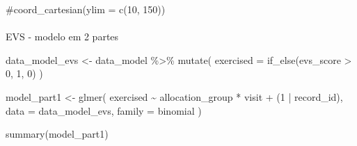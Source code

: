 \documentclass[
  12pt,
]{article}
\makeatletter
\let\oldparagraph\paragraph
\renewcommand{\paragraph}{
    \@ifstar
      \xxxParagraphStar
      \xxxParagraphNoStar
  }
\newcommand{\xxxParagraphStar}[1]{\oldparagraph*{#1}\mbox{}}
\newcommand{\xxxParagraphNoStar}[1]{\oldparagraph{#1}\mbox{}}
\newenvironment{Shaded}{\begin{snugshade}}{\end{snugshade}}
\newcommand{\AttributeTok}[1]{\textcolor[rgb]{0.40,0.45,0.13}{#1}}
\newcommand{\CommentTok}[1]{\textcolor[rgb]{0.37,0.37,0.37}{#1}}
\newcommand{\DecValTok}[1]{\textcolor[rgb]{0.68,0.00,0.00}{#1}}
\newcommand{\FunctionTok}[1]{\textcolor[rgb]{0.28,0.35,0.67}{#1}}
\newcommand{\NormalTok}[1]{\textcolor[rgb]{0.00,0.23,0.31}{#1}}
\newcommand{\OtherTok}[1]{\textcolor[rgb]{0.00,0.23,0.31}{#1}}
\newcommand{\SpecialCharTok}[1]{\textcolor[rgb]{0.37,0.37,0.37}{#1}}
\makeatother
\begin{document}
\begin{Shaded}
\begin{Highlighting}[]
    \CommentTok{\#coord\_cartesian(ylim = c(10, 150))}
\end{Highlighting}
\end{Shaded}

\paragraph{EVS - modelo em 2 partes}\label{evs---modelo-em-2-partes}

\begin{Shaded}
\begin{Highlighting}[]
\NormalTok{data\_model\_evs }\OtherTok{\textless{}{-}}\NormalTok{ data\_model }\SpecialCharTok{\%\textgreater{}\%}
  \FunctionTok{mutate}\NormalTok{(}
    \AttributeTok{exercised =} \FunctionTok{if\_else}\NormalTok{(evs\_score }\SpecialCharTok{\textgreater{}} \DecValTok{0}\NormalTok{, }\DecValTok{1}\NormalTok{, }\DecValTok{0}\NormalTok{)}
\NormalTok{  )}

\NormalTok{model\_part1 }\OtherTok{\textless{}{-}} \FunctionTok{glmer}\NormalTok{(}
\NormalTok{  exercised }\SpecialCharTok{\textasciitilde{}}\NormalTok{ allocation\_group }\SpecialCharTok{*}\NormalTok{ visit }\SpecialCharTok{+}\NormalTok{ (}\DecValTok{1} \SpecialCharTok{|}\NormalTok{ record\_id),}
  \AttributeTok{data =}\NormalTok{ data\_model\_evs,}
  \AttributeTok{family =}\NormalTok{ binomial}
\NormalTok{)}

\FunctionTok{summary}\NormalTok{(model\_part1)}
\end{Highlighting}
\end{Shaded}
\end{document}
